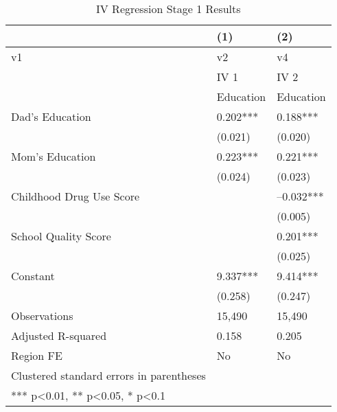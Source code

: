 \documentclass{article}
\begin{document}
\begin{table}[tbp] \centering
{}

\caption{IV Regression Stage 1 Results}
\begin{tabularx}{\linewidth}{@{}lCC@{}}

\toprule
&{(1)}&{(2)} \tabularnewline \midrule
{v1}&{v2}&{v4} \tabularnewline
\midrule \addlinespace[\belowrulesep]
&IV 1&IV 2 \tabularnewline
&Education&Education \tabularnewline
\midrule Dad's Education&0.202***&0.188*** \tabularnewline
&(0.021)&(0.020) \tabularnewline
Mom's Education&0.223***&0.221*** \tabularnewline
&(0.024)&(0.023) \tabularnewline
Childhood Drug Use Score&&--0.032*** \tabularnewline
&&(0.005) \tabularnewline
School Quality Score&&0.201*** \tabularnewline
&&(0.025) \tabularnewline
Constant&9.337***&9.414*** \tabularnewline
&(0.258)&(0.247) \tabularnewline
\midrule Observations&15,490&15,490 \tabularnewline
Adjusted R-squared&0.158&0.205 \tabularnewline
Region FE&No&No \tabularnewline
Clustered standard errors in parentheses&& \tabularnewline
*** p<0.01, ** p<0.05, * p<0.1&& \tabularnewline
\bottomrule 

\end{tabularx}
\end{table}
\end{document}

